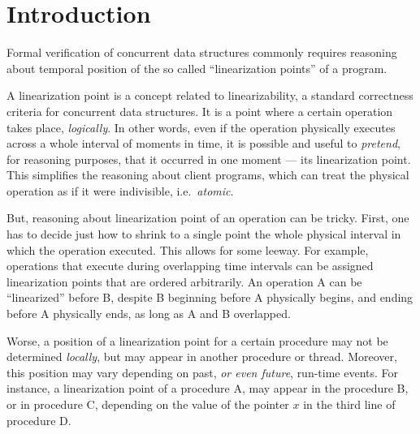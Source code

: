 
\section{Introduction}
\label{sc:intro}


Formal verification of concurrent data structures commonly requires
reasoning about temporal position of the so called ``linearization
points'' of a program.

A linearization point is a concept related to linearizability, a
standard correctness criteria for concurrent data structures. It is a
point where a certain operation takes place, \emph{logically}.  In
other words, even if the operation physically executes across a whole
interval of moments in time, it is possible and useful to
\emph{pretend}, for reasoning purposes, that it occurred in one moment
--- its linearization point. This simplifies the reasoning about
client programs, which can treat the physical operation as if it were
indivisible, i.e.~\emph{atomic}.

But, reasoning about linearization point of an operation can be
tricky. First, one has to decide just how to shrink to a single point
the whole physical interval in which the operation executed. This
allows for some leeway. For example, operations that execute during
overlapping time intervals can be assigned linearization points that
are ordered arbitrarily. An operation A can be ``linearized'' before
B, despite B beginning before A physically begins, and ending before A
physically ends, as long as A and B overlapped.

Worse, a position of a linearization point for a certain procedure may
not be determined \emph{locally}, but may appear in another procedure
or thread. Moreover, this position may vary depending on past,
\emph{or even future}, run-time events. For instance, a linearization
point of a procedure A, may appear in the procedure B, or in procedure
C, depending on the value of the pointer $x$ in the third line of
procedure D.

%
%
 

